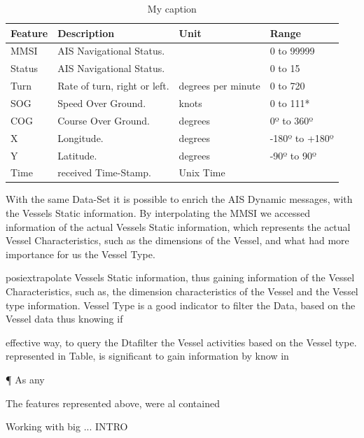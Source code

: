 \begin{table}[H]
\centering
\caption{My caption}
\label{Table: Data-Set Features}
\begin{tabular}{@{}llll@{}}
\toprule
Feature & Description                  & Unit               & Range          \\ \midrule
MMSI    & AIS Navigational Status.     &                    & 0 to 99999     \\
Status  & AIS Navigational Status.     &                    & 0 to 15        \\
Turn    & Rate of turn, right or left. & degrees per minute & 0 to 720       \\
SOG     & Speed Over Ground.           & knots              & 0 to 111*      \\
COG     & Course Over Ground.          & degrees            & 0º to 360º     \\
X       & Longitude.                   & degrees            & -180º to +180º \\
Y       & Latitude.                    & degrees            & -90º to 90º    \\
Time    & received Time-Stamp.         & Unix Time          &                \\ \bottomrule
\end{tabular}
\end{table}

With the same Data-Set it is possible to enrich the AIS Dynamic messages, with the Vessels Static information. By interpolating the MMSI we accessed information of the actual Vessels Static information, which represents the actual Vessel Characteristics, such as the dimensions of the Vessel, and what had more importance for us the Vessel Type.




posiextrapolate Vessels Static information, thus gaining information of the Vessel Characteristics, such as, the dimension characteristics of the Vessel and the Vessel type information. Vessel Type is a good indicator to filter the Data, based on the Vessel data thus knowing if

effective way, to query the Dtafilter the Vessel activities based on the Vessel type.
represented in Table, is significant to gain information by know in

\P
As any 

 The features represented above, were al contained 

Working with big ... INTRO

